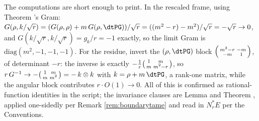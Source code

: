 The computations are short enough to print. In the rescaled frame, using Theorem 's Gram: $G(\rho, k/\sqrt r) = (G(\rho,\rho) + m\,G(\rho,\dtPG))/\sqrt r = ((m^2 - r) - m^2)/\sqrt r = -\sqrt r \to 0$, and $G(k/\sqrt r, k/\sqrt r) = g_k/r = -1$ exactly, so the limit Gram is $\mathrm{diag}(m^2, -1, -1, -1)$. For the residue, invert the $(\rho, \dtPG)$ block $\begin{psmallmatrix} m^2 - r & -m \\ -m & 1 \end{psmallmatrix}$, of determinant $-r$: the inverse is exactly $-\tfrac1r \begin{psmallmatrix} 1 & m \\ m & m^2 - r \end{psmallmatrix}$, so $r\,G^{-1} \to -\begin{psmallmatrix} 1 & m \\ m & m^2 \end{psmallmatrix} = -\,k \otimes k$ with $k = \rho + m\,\dtPG$, a rank-one matrix, while the angular block contributes $r \cdot O(1) \to 0$. All of this is confirmed as rational-function identities in the script; the invariance clauses are Lemma  and Theorem , applied one-sidedly per Remark \ref{rem:boundarytame} and read in $N^*_rE$ per the Conventions.
